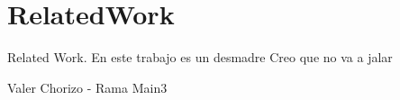 \section{RelatedWork}

Related Work. En este trabajo es un desmadre Creo que no va a jalar

Valer Chorizo - Rama Main3


